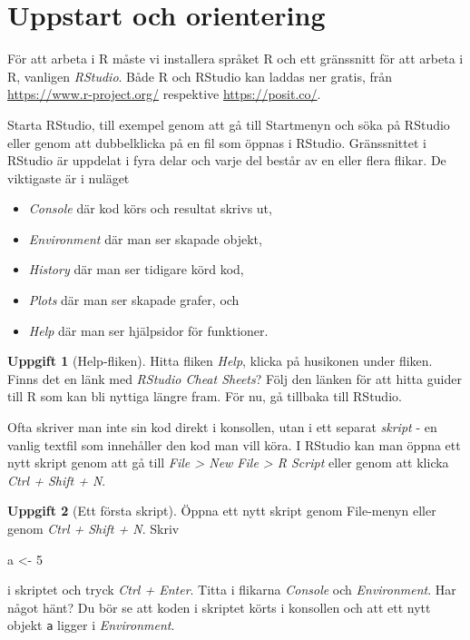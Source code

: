 \documentclass[
]{book}
\newenvironment{Shaded}{\begin{snugshade}}{\end{snugshade}}
\newcommand{\DecValTok}[1]{\textcolor[rgb]{0.00,0.00,0.81}{#1}}
\newcommand{\NormalTok}[1]{#1}
\newcommand{\OtherTok}[1]{\textcolor[rgb]{0.56,0.35,0.01}{#1}}
\providecommand{\tightlist}{%
  \setlength{\itemsep}{0pt}\setlength{\parskip}{0pt}}
\theoremstyle{definition}
\theoremstyle{definition}
\theoremstyle{definition}
\newtheorem{exercise}{Uppgift}[chapter]
\theoremstyle{definition}
\theoremstyle{remark}
\begin{document}
\section{Uppstart och orientering}\label{uppstart-och-orientering}

För att arbeta i R måste vi installera språket R och ett gränssnitt för att arbeta i R, vanligen \emph{RStudio}. Både R och RStudio kan laddas ner gratis, från \url{https://www.r-project.org/} respektive \url{https://posit.co/}.

Starta RStudio, till exempel genom att gå till Startmenyn och söka på RStudio eller genom att dubbelklicka på en fil som öppnas i RStudio.
Gränssnittet i RStudio är uppdelat i fyra delar och varje del består av en eller flera flikar. De viktigaste är i nuläget

\begin{itemize}
\tightlist
\item
  \emph{Console} där kod körs och resultat skrivs ut,
\item
  \emph{Environment} där man ser skapade objekt,
\item
  \emph{History} där man ser tidigare körd kod,
\item
  \emph{Plots} där man ser skapade grafer, och
\item
  \emph{Help} där man ser hjälpsidor för funktioner.
\end{itemize}

\begin{exercise}[Help-fliken]
Hitta fliken \emph{Help}, klicka på husikonen under fliken. Finns det en länk med \emph{RStudio Cheat Sheets}? Följ den länken för att hitta guider till R som kan bli nyttiga längre fram. För nu, gå tillbaka till RStudio.
\end{exercise}

Ofta skriver man inte sin kod direkt i konsollen, utan i ett separat \emph{skript} - en vanlig textfil som innehåller den kod man vill köra. I RStudio kan man öppna ett nytt skript genom att gå till \emph{File \textgreater{} New File \textgreater{} R Script} eller genom att klicka \emph{Ctrl + Shift + N}.

\begin{exercise}[Ett första skript]
Öppna ett nytt skript genom File-menyn eller genom \emph{Ctrl + Shift + N}.
Skriv

\begin{Shaded}
\begin{Highlighting}[]
\NormalTok{a }\OtherTok{\textless{}{-}} \DecValTok{5}
\end{Highlighting}
\end{Shaded}

i skriptet och tryck \emph{Ctrl + Enter}. Titta i flikarna \emph{Console} och \emph{Environment}. Har något hänt? Du bör se att koden i skriptet körts i konsollen och att ett nytt objekt \texttt{a} ligger i \emph{Environment}.
\end{exercise}
\end{document}
